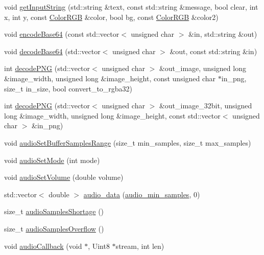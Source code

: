\begin{DoxyCompactItemize}
\item 
void \hyperlink{namespaceQuickCG_a48166a7d3d6279491fbc869928b50416}{get\-Input\-String} (std\-::string \&text, const std\-::string \&message, bool clear, int x, int y, const \hyperlink{structQuickCG_1_1ColorRGB}{Color\-R\-G\-B} \&color, bool bg, const \hyperlink{structQuickCG_1_1ColorRGB}{Color\-R\-G\-B} \&color2)
\item 
void \hyperlink{namespaceQuickCG_a47a098aae8382e561e2f41c3cab13aae}{encode\-Base64} (const std\-::vector$<$ unsigned char $>$ \&in, std\-::string \&out)
\item 
void \hyperlink{namespaceQuickCG_a92ab4bdbd0a3c996ec65424ed385710f}{decode\-Base64} (std\-::vector$<$ unsigned char $>$ \&out, const std\-::string \&in)
\item 
int \hyperlink{namespaceQuickCG_a5c2363e8d760153fd27022d870a2ac38}{decode\-P\-N\-G} (std\-::vector$<$ unsigned char $>$ \&out\-\_\-image, unsigned long \&image\-\_\-width, unsigned long \&image\-\_\-height, const unsigned char $\ast$in\-\_\-png, size\-\_\-t in\-\_\-size, bool convert\-\_\-to\-\_\-rgba32)
\item 
int \hyperlink{namespaceQuickCG_a04e7c604481711a0a3904607e4f82c9e}{decode\-P\-N\-G} (std\-::vector$<$ unsigned char $>$ \&out\-\_\-image\-\_\-32bit, unsigned long \&image\-\_\-width, unsigned long \&image\-\_\-height, const std\-::vector$<$ unsigned char $>$ \&in\-\_\-png)
\item 
void \hyperlink{namespaceQuickCG_af653bab27b0d113307c7bf0e0d9168ad}{audio\-Set\-Buffer\-Samples\-Range} (size\-\_\-t min\-\_\-samples, size\-\_\-t max\-\_\-samples)
\item 
void \hyperlink{namespaceQuickCG_a173f56daf3d8be71fea4164db2b49638}{audio\-Set\-Mode} (int mode)
\item 
void \hyperlink{namespaceQuickCG_a0c553a6b56b23a8c880f0e4717b4040c}{audio\-Set\-Volume} (double volume)
\item 
std\-::vector$<$ double $>$ \hyperlink{namespaceQuickCG_a77f091287a743507c7ed336fa1727361}{audio\-\_\-data} (\hyperlink{namespaceQuickCG_aff1dcb3d84732f1501f618bae7a211d3}{audio\-\_\-min\-\_\-samples}, 0)
\item 
size\-\_\-t \hyperlink{namespaceQuickCG_ab3f49f0d65cf44604dc58bdaf2142a37}{audio\-Samples\-Shortage} ()
\item 
size\-\_\-t \hyperlink{namespaceQuickCG_aa3009029d7a860f0b889ed6c11b9385b}{audio\-Samples\-Overflow} ()
\item 
void \hyperlink{namespaceQuickCG_a16f75e263e20fd38624e968afd791d19}{audio\-Callback} (void $\ast$, Uint8 $\ast$stream, int len)

\end{DoxyCompactItemize}
